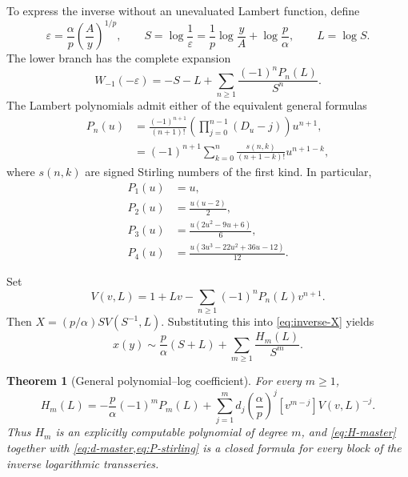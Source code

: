 \documentclass[11pt]{article}
\newtheorem{theorem}{Theorem}[section]
\theoremstyle{definition}
\theoremstyle{remark}
\begin{document}
To express the inverse without an unevaluated Lambert function, define
\begin{equation}
 \varepsilon=\frac\alpha p\left(\frac Ay\right)^{1/p},
 \qquad
 S=\log\frac1\varepsilon
 =\frac1p\log\frac yA+\log\frac p\alpha,
 \qquad
 L=\log S.
 \label{eq:S-L}
\end{equation}
The lower branch has the complete expansion
\begin{equation}
 W_{-1}(-\varepsilon)
 =-S-L+\sum_{n\geq1}\frac{(-1)^nP_n(L)}{S^n}.
 \label{eq:Wminus-expansion}
\end{equation}
The Lambert polynomials admit either of the equivalent general formulas
\begin{align}
 P_n(u)
 &=\frac{(-1)^{n+1}}{(n+1)!}
   \left(\prod_{j=0}^{n-1}(D_u-j)\right)u^{n+1},
 \label{eq:P-operator}\\
 &=(-1)^{n+1}\sum_{k=0}^n
   \frac{s(n,k)}{(n+1-k)!}u^{n+1-k},
 \label{eq:P-stirling}
\end{align}
where $s(n,k)$ are signed Stirling numbers of the first kind.  In particular,
\begin{align*}
 P_1(u)&=u,\\
 P_2(u)&=\frac{u(u-2)}2,\\
 P_3(u)&=\frac{u(2u^2-9u+6)}6,\\
 P_4(u)&=\frac{u(3u^3-22u^2+36u-12)}{12}.
\end{align*}

Set
\begin{equation}
 V(v,L)=1+Lv-\sum_{n\geq1}(-1)^nP_n(L)v^{n+1}.
 \label{eq:V}
\end{equation}
Then $X=(p/\alpha)S V(S^{-1},L)$.  Substituting this into
\cref{eq:inverse-X} yields
\begin{equation}
 x(y)\sim\frac p\alpha(S+L)+\sum_{m\geq1}\frac{H_m(L)}{S^m}.
 \label{eq:polylog-inverse}
\end{equation}

\begin{theorem}[General polynomial--log coefficient]
\label{thm:H-coefficients}
For every $m\geq1$,
\begin{equation}
 \boxed{
 H_m(L)=-\frac p\alpha(-1)^mP_m(L)
 +\sum_{j=1}^m d_j\left(\frac\alpha p\right)^j
 [v^{m-j}]V(v,L)^{-j}.}
 \label{eq:H-master}
\end{equation}
Thus $H_m$ is an explicitly computable polynomial of degree $m$, and
\cref{eq:H-master} together with \cref{eq:d-master,eq:P-stirling} is a closed
formula for every block of the inverse logarithmic transseries.
\end{theorem}
\end{document}
